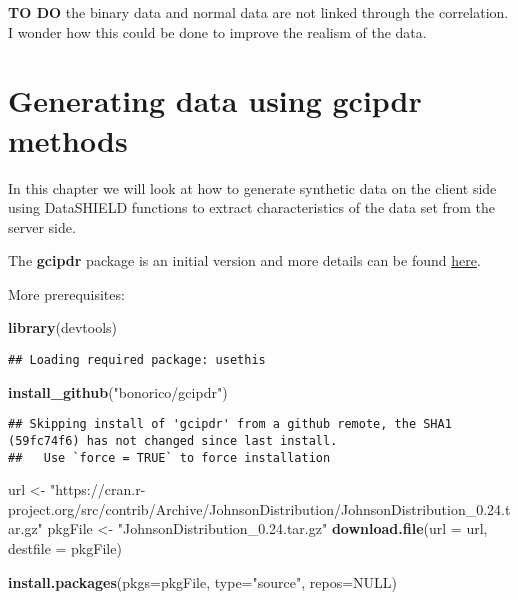 \documentclass[
]{book}
\newenvironment{Shaded}{\begin{snugshade}}{\end{snugshade}}
\newcommand{\DataTypeTok}[1]{\textcolor[rgb]{0.13,0.29,0.53}{#1}}
\newcommand{\KeywordTok}[1]{\textcolor[rgb]{0.13,0.29,0.53}{\textbf{#1}}}
\newcommand{\NormalTok}[1]{#1}
\newcommand{\OtherTok}[1]{\textcolor[rgb]{0.56,0.35,0.01}{#1}}
\newcommand{\StringTok}[1]{\textcolor[rgb]{0.31,0.60,0.02}{#1}}
\begin{document}
\textbf{TO DO} the binary data and normal data are not linked through the correlation. I wonder how this could be done to improve the realism of the data.

\hypertarget{generating-data-using-gcipdr-methods}{%
\chapter{Generating data using gcipdr methods}\label{generating-data-using-gcipdr-methods}}

In this chapter we will look at how to generate synthetic data on the client side using DataSHIELD functions to extract characteristics of the data set from the server side.

The \textbf{gcipdr} package is an initial version and more details can be found \href{https://github.com/bonorico/gcipdr}{here}.

More prerequisites:

\begin{Shaded}
\begin{Highlighting}[]
\KeywordTok{library}\NormalTok{(devtools)}
\end{Highlighting}
\end{Shaded}

\begin{verbatim}
## Loading required package: usethis
\end{verbatim}

\begin{Shaded}
\begin{Highlighting}[]
\KeywordTok{install_github}\NormalTok{(}\StringTok{"bonorico/gcipdr"}\NormalTok{)}
\end{Highlighting}
\end{Shaded}

\begin{verbatim}
## Skipping install of 'gcipdr' from a github remote, the SHA1 (59fc74f6) has not changed since last install.
##   Use `force = TRUE` to force installation
\end{verbatim}

\begin{Shaded}
\begin{Highlighting}[]
\NormalTok{url <-}\StringTok{ "https://cran.r-project.org/src/contrib/Archive/JohnsonDistribution/JohnsonDistribution_0.24.tar.gz"}
\NormalTok{pkgFile <-}\StringTok{ "JohnsonDistribution_0.24.tar.gz"}
\KeywordTok{download.file}\NormalTok{(}\DataTypeTok{url =}\NormalTok{ url, }\DataTypeTok{destfile =}\NormalTok{ pkgFile)}

\KeywordTok{install.packages}\NormalTok{(}\DataTypeTok{pkgs=}\NormalTok{pkgFile, }\DataTypeTok{type=}\StringTok{"source"}\NormalTok{, }\DataTypeTok{repos=}\OtherTok{NULL}\NormalTok{)}
\end{Highlighting}
\end{Shaded}
\end{document}
